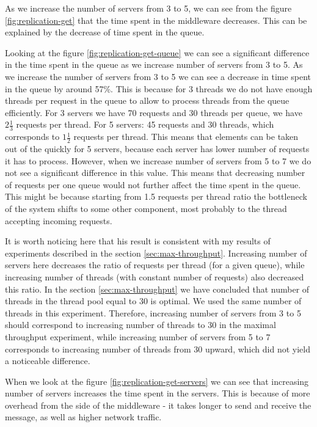 \documentclass[11pt]{article}
\begin{document}
As we increase the number of servers from 3 to 5, we can see from the figure \ref{fig:replication-get} that the time spent in the middleware decreases. This can be explained by the decrease of time spent in the queue. 

Looking at the figure \ref{fig:replication-get-queue} we can see a significant difference in the time spent in the queue as we increase number of servers from 3 to 5. As we increase the number of servers from 3 to 5 we can see a decrease in time spent in the queue by around 57\%. This is because for 3 threads we do not have enough threads per request in the queue to allow to process threads from the queue efficiently. For 3 servers we have 70 requests and 30 threads per queue, we have $2\frac{1}{3}$ requests per thread. For 5 servers: 45 requests and 30 threads, which corresponds to $1\frac{1}{2}$ requests per thread. This means that elements can be taken out of the quickly for 5 servers, because each server has lower number of requests it has to process. However, when we increase number of servers from 5 to 7 we do not see a significant difference in this value. This means that decreasing number of requests per one queue would not further affect the time spent in the queue. This might be because starting from 1.5 requests per thread ratio the bottleneck of the system shifts to some other component, most probably to the thread accepting incoming requests.

It is worth noticing here that his result is consistent with my results of experiments described in the section \ref{sec:max-throughput}. Increasing number of servers here decreases the ratio of requests per thread (for a given queue), while increasing number of threads (with constant number of requests) also decreased this ratio. In the section \ref{sec:max-throughput} we have concluded that number of threads in the thread pool equal to 30 is optimal. We used the same number of threads in this experiment. Therefore, increasing number of servers from 3 to 5 should correspond to increasing number of threads to 30 in the maximal throughput experiment, while increasing number of servers from 5 to 7 corresponds to increasing number of threads from 30 upward, which did not yield a noticeable difference.

When we look at the figure \ref{fig:replication-get-servers} we can see that increasing number of servers increases the time spent in the servers. This is because of more overhead from the side of the middleware - it takes longer to send and receive the message, as well as higher network traffic.
\end{document}
